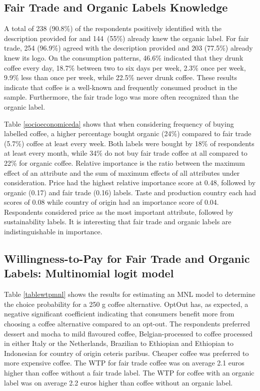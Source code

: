 \documentclass[sustainability,article,accept,moreauthors,pdftex,10pt,a4paper]{Definitions/mdpi}
\theoremstyle{mdpi}
\newcounter{ex}
\newcounter{re}
\theoremstyle{mdpidefinition}
\begin{document}
{\subsection{Fair Trade and Organic Labels Knowledge}
\par{A total of 238 (90.8\%) of the respondents positively identified with the description provided for and 144~(55\%) already knew the organic label. For fair trade, 254 (96.9\%) agreed with the description provided and 203 (77.5\%) already knew its logo. On the consumption patterns, 46.6\% indicated that they drunk coffee every day, 18.7\% between two to six days per week, 2.3\% once per week, 9.9\% less than once per week, while 22.5\% never drunk coffee. These results indicate that coffee is a well-known and frequently consumed product in the sample. Furthermore, the fair trade logo was more often recognized than the organic label. }
\par{Table \ref{socioeconomiceda} shows that when considering frequency of buying labelled coffee, a higher percentage bought organic (24\%) compared to fair trade (5.7\%) coffee at least every week. Both labels were bought by 18\% of respondents at least every month, while 34\% do not buy fair trade coffee at all compared to 22\% for organic coffee. \iffalse To explore which product attributes were most important when purchasing a coffee alternative, we \iffalse fitted a single-class\fi calculated relative importance statistics~\cite{Vermunt2013} from the MNL model. \iffalse in Latent Gold \fi \iffalse and extracted attributes' relative importance\fi Relative importance is the ratio between the maximum effect of an attribute and the sum of maximum effects of all attributes under consideration. Price had the highest relative importance score at 0.48, followed by organic (0.17) and fair trade (0.16) labels. Taste \iffalse, country of origin \fi and production country each had scores of 0.08 while country of origin had an importance score of 0.04. Respondents considered price as the most important attribute, followed by sustainability labels. It is interesting that fair trade and organic labels are indistinguishable in importance.\fi}

\subsection{Willingness-to-Pay for Fair Trade and Organic Labels: Multinomial logit model}\label{wtpmnl}
\par{Table \ref{tablewtpmnl} shows the results for estimating an MNL model to determine the choice probability for a 250 g coffee alternative. OptOut has, as expected, a negative significant coefficient indicating that consumers benefit more from choosing a coffee alternative compared to an opt-out. The respondents preferred dessert and mocha to mild flavoured coffee, Belgian-processed to coffee processed in either Italy or the Netherlands, Brazilian to Ethiopian and Ethiopian to Indonesian for country of origin  ceteris paribus. Cheaper coffee was preferred to more expensive coffee. The WTP for fair trade coffee was on average 2.1 euros higher than coffee without a fair trade label. The WTP for coffee with an organic label was on average 2.2 euros higher than coffee without an organic label.

}}
\end{document}

